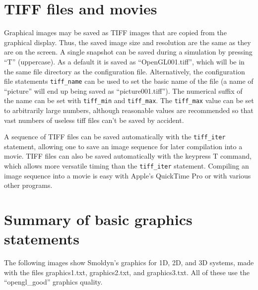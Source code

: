 \documentclass {book}
\newcommand {\ttt} {\texttt}
\begin{document}
\section{TIFF files and movies}

Graphical images may be saved as TIFF images that are copied from the graphical display. Thus, the saved image size and resolution are the same as they are on the screen. A single snapshot can be saved during a simulation by pressing ``T'' (uppercase). As a default it is saved as ``OpenGL001.tiff'', which will be in the same file directory as the configuration file. Alternatively, the configuration file statements \ttt{tiff\_name} can be used to set the basic name of the file (a name of ``picture'' will end up being saved as ``picture001.tiff''). The numerical suffix of the name can be set with \ttt{tiff\_min} and \ttt{tiff\_max}. The \ttt{tiff\_max} value can be set to arbitrarily large numbers, although reasonable values are recommended so that vast numbers of useless tiff files can't be saved by accident.

A sequence of TIFF files can be saved automatically with the \ttt{tiff\_iter} statement, allowing one to save an image sequence for later compilation into a movie. TIFF files can also be saved automatically with the keypress T command, which allows more versatile timing than the \ttt{tiff\_iter} statement. Compiling an image sequence into a movie is easy with Apple's QuickTime Pro or with various other programs.

\section{Summary of basic graphics statements}

The following images show Smoldyn's graphics for 1D, 2D, and 3D systems, made with the files graphics1.txt, graphics2.txt, and graphics3.txt. All of these use the ``opengl\_good'' graphics quality.
\end{document}
